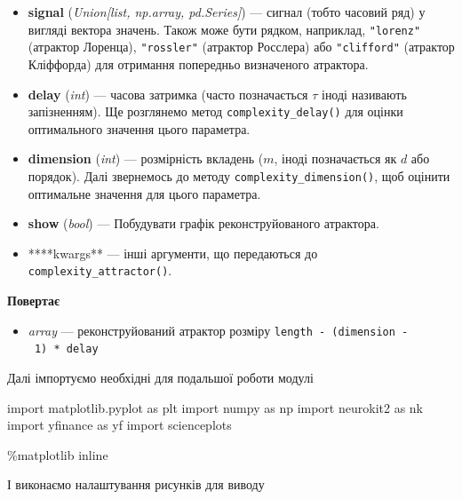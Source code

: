 \documentclass[
  letterpaper,
]{report}
\newenvironment{Shaded}{\begin{snugshade}}{\end{snugshade}}
\newcommand{\ImportTok}[1]{\textcolor[rgb]{0.00,0.46,0.62}{#1}}
\newcommand{\NormalTok}[1]{\textcolor[rgb]{0.00,0.23,0.31}{#1}}
\newcommand{\OperatorTok}[1]{\textcolor[rgb]{0.37,0.37,0.37}{#1}}
\providecommand{\tightlist}{%
  \setlength{\itemsep}{0pt}\setlength{\parskip}{0pt}}\usepackage{longtable,booktabs,array}
\begin{document}
\begin{itemize}
\tightlist
\item
  \textbf{signal} (\emph{Union{[}list, np.array, pd.Series{]}}) ---
  сигнал (тобто часовий ряд) у вигляді вектора значень. Також може бути
  рядком, наприклад, \texttt{"lorenz"} (атрактор Лоренца),
  \texttt{"rossler"} (атрактор Росслера) або \texttt{"clifford"}
  (атрактор Кліффорда) для отримання попередньо визначеного атрактора.
\item
  \textbf{delay} (\emph{int}) --- часова затримка (часто позначається
  \(\tau\) іноді називають запізненням). Ще розглянемо метод
  \texttt{complexity\_delay()} для оцінки оптимального значення цього
  параметра.
\item
  \textbf{dimension} (\emph{int}) --- розмірність вкладень (\(m\), іноді
  позначається як \(d\) або порядок). Далі звернемось до методу
  \texttt{complexity\_dimension()}, щоб оцінити оптимальне значення для
  цього параметра.
\item
  \textbf{show} (\emph{bool}) --- Побудувати графік реконструйованого
  атрактора.
\item
  ****kwargs** --- інші аргументи, що передаються до
  \texttt{complexity\_attractor()}.
\end{itemize}

\textbf{Повертає}

\begin{itemize}
\tightlist
\item
  \emph{array} --- реконструйований атрактор розміру
  \texttt{length\ -\ (dimension\ -\ 1)\ *\ delay}
\end{itemize}

Далі імпортуємо необхідні для подальшої роботи модулі

\begin{Shaded}
\begin{Highlighting}[]
\ImportTok{import}\NormalTok{ matplotlib.pyplot }\ImportTok{as}\NormalTok{ plt }
\ImportTok{import}\NormalTok{ numpy }\ImportTok{as}\NormalTok{ np}
\ImportTok{import}\NormalTok{ neurokit2 }\ImportTok{as}\NormalTok{ nk}
\ImportTok{import}\NormalTok{ yfinance }\ImportTok{as}\NormalTok{ yf}
\ImportTok{import}\NormalTok{ scienceplots}

\OperatorTok{\%}\NormalTok{matplotlib inline}
\end{Highlighting}
\end{Shaded}

І виконаємо налаштування рисунків для виводу
\end{document}
